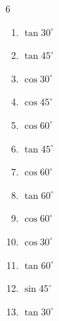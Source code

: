 \begin{multicols}{6}
\begin{enumerate}
        \phantom{$\displaystyle =1$}

  \item $\displaystyle \tan{30^\circ}$


  \item $\displaystyle \tan{45^\circ}$

        \phantom{$\displaystyle =1$}

  \item $\displaystyle \cos{30^\circ}$


  \item $\displaystyle \cos{45^\circ}$


  \item $\displaystyle \cos{60^\circ}$


  \item $\displaystyle \tan{45^\circ}$

        \phantom{$\displaystyle =1$}

  \item $\displaystyle \cos{60^\circ}$


  \item $\displaystyle \tan{60^\circ}$


  \item $\displaystyle \cos{60^\circ}$


  \item $\displaystyle \cos{30^\circ}$


  \item $\displaystyle \tan{60^\circ}$


  \item $\displaystyle \sin{45^\circ}$


  \item $\displaystyle \tan{30^\circ}$


\end{enumerate}
\end{multicols}
